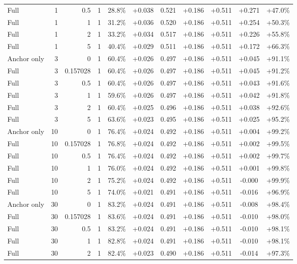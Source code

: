 \begin{table}[htbp]
\begin{tabular}{lrrrccccccc}
Full & 1 & 0.5 & 1 & 28.8\% & +0.038 & 0.521 & +0.186 & +0.511 & +0.271 & +47.0\% \\
Full & 1 & 1 & 1 & 31.2\% & +0.036 & 0.520 & +0.186 & +0.511 & +0.254 & +50.3\% \\
Full & 1 & 2 & 1 & 33.2\% & +0.034 & 0.517 & +0.186 & +0.511 & +0.226 & +55.8\% \\
Full & 1 & 5 & 1 & 40.4\% & +0.029 & 0.511 & +0.186 & +0.511 & +0.172 & +66.3\% \\
Anchor only & 3 & 0 & 1 & 60.4\% & +0.026 & 0.497 & +0.186 & +0.511 & +0.045 & +91.1\% \\
Full & 3 & 0.157028 & 1 & 60.4\% & +0.026 & 0.497 & +0.186 & +0.511 & +0.045 & +91.2\% \\
Full & 3 & 0.5 & 1 & 60.4\% & +0.026 & 0.497 & +0.186 & +0.511 & +0.043 & +91.6\% \\
Full & 3 & 1 & 1 & 59.6\% & +0.026 & 0.497 & +0.186 & +0.511 & +0.042 & +91.8\% \\
Full & 3 & 2 & 1 & 60.4\% & +0.025 & 0.496 & +0.186 & +0.511 & +0.038 & +92.6\% \\
Full & 3 & 5 & 1 & 63.6\% & +0.023 & 0.495 & +0.186 & +0.511 & +0.025 & +95.2\% \\
Anchor only & 10 & 0 & 1 & 76.4\% & +0.024 & 0.492 & +0.186 & +0.511 & +0.004 & +99.2\% \\
Full & 10 & 0.157028 & 1 & 76.8\% & +0.024 & 0.492 & +0.186 & +0.511 & +0.002 & +99.5\% \\
Full & 10 & 0.5 & 1 & 76.4\% & +0.024 & 0.492 & +0.186 & +0.511 & +0.002 & +99.7\% \\
Full & 10 & 1 & 1 & 76.0\% & +0.024 & 0.492 & +0.186 & +0.511 & +0.001 & +99.8\% \\
Full & 10 & 2 & 1 & 75.2\% & +0.024 & 0.492 & +0.186 & +0.511 & -0.000 & +99.9\% \\
Full & 10 & 5 & 1 & 74.0\% & +0.021 & 0.491 & +0.186 & +0.511 & -0.016 & +96.9\% \\
Anchor only & 30 & 0 & 1 & 83.2\% & +0.024 & 0.491 & +0.186 & +0.511 & -0.008 & +98.4\% \\
Full & 30 & 0.157028 & 1 & 83.6\% & +0.024 & 0.491 & +0.186 & +0.511 & -0.010 & +98.0\% \\
Full & 30 & 0.5 & 1 & 83.2\% & +0.024 & 0.491 & +0.186 & +0.511 & -0.010 & +98.1\% \\
Full & 30 & 1 & 1 & 82.8\% & +0.024 & 0.491 & +0.186 & +0.511 & -0.010 & +98.1\% \\
Full & 30 & 2 & 1 & 82.4\% & +0.023 & 0.490 & +0.186 & +0.511 & -0.014 & +97.3\% \\

\end{tabular}
\end{table}
